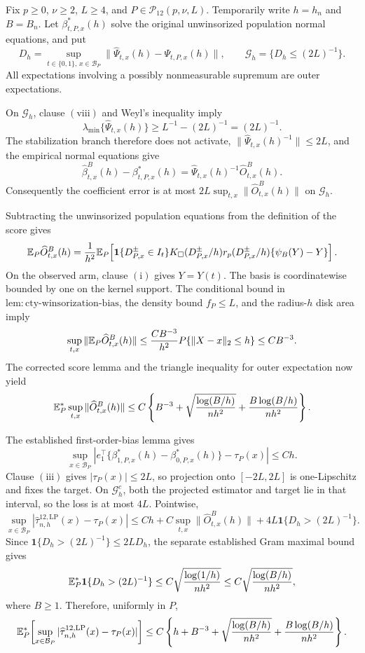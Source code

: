 Fix \(p\geq0\), \(\nu\geq2\), \(L\geq4\), and \(P\in\mathcal P_{12}(p,\nu,L)\).  Temporarily write \(h=h_n\) and \(B=B_n\).  Let \(\beta^*_{t,P,x}(h)\) solve the original unwinsorized population normal equations, and put
\[
 D_h=\sup_{t\in\{0,1\},\,x\in\mathcal B_P}
 \|\widehat\Psi_{t,x}(h)-\Psi_{t,P,x}(h)\|,
 \qquad \mathcal G_h=\{D_h\leq(2L)^{-1}\}.
\]
All expectations involving a possibly nonmeasurable supremum are outer expectations.

On \(\mathcal G_h\), clause \(\mathrm{(viii)}\) and Weyl's inequality imply
\[
 \lambda_{\min}\{\widehat\Psi_{t,x}(h)\}\geq L^{-1}-(2L)^{-1}=(2L)^{-1}.
\]
The stabilization branch therefore does not activate, \(\|\widehat\Psi_{t,x}(h)^{-1}\|\leq2L\), and the empirical normal equations give
\[
 \widehat\beta^B_{t,x}(h)-\beta^*_{t,P,x}(h)
 =\widehat\Psi_{t,x}(h)^{-1}\widehat O^B_{t,x}(h).
\]
Consequently the coefficient error is at most \(2L\sup_{t,x}\|\widehat O^B_{t,x}(h)\|\) on \(\mathcal G_h\).

Subtracting the unwinsorized population equations from the definition of the score gives
\[
 \mathbb E_P\widehat O^B_{t,x}(h)
 ={1\over h^2}\mathbb E_P\!\left[
 \mathbf1\{D^{\pm}_{P,x}\in I_t\}K_\square(D^{\pm}_{P,x}/h)
 r_p(D^{\pm}_{P,x}/h)\{\psi_B(Y)-Y\}
 \right].
\]
On the observed arm, clause \(\mathrm{(i)}\) gives \(Y=Y(t)\).  The basis is coordinatewise bounded by one on the kernel support.  The conditional bound in \(\mathrm{lem:cty\text{-}winsorization\text{-}bias}\), the density bound \(f_P\leq L\), and the radius-\(h\) disk area imply
\[
 \sup_{t,x}\|\mathbb E_P\widehat O^B_{t,x}(h)\|
 \leq {C B^{-3}\over h^2}P\{\|X-x\|_2\leq h\}
 \leq C B^{-3}.
\]
The corrected score lemma and the triangle inequality for outer expectation now yield
\[
 \mathbb E_P^*\sup_{t,x}\|\widehat O^B_{t,x}(h)\|
 \leq C\left\{B^{-3}+\sqrt{{\log(B/h)\over nh^2}}
 +{B\log(B/h)\over nh^2}\right\}.
\]

The established first-order-bias lemma gives
\[
 \sup_{x\in\mathcal B_P}\left|
 e_1^\top\{\beta^*_{1,P,x}(h)-\beta^*_{0,P,x}(h)\}-\tau_P(x)
 \right|\leq Ch.
\]
Clause \(\mathrm{(iii)}\) gives \(|\tau_P(x)|\leq2L\), so projection onto \([-2L,2L]\) is one-Lipschitz and fixes the target.  On \(\mathcal G_h^c\), both the projected estimator and target lie in that interval, so the loss is at most \(4L\).  Pointwise,
\[
 \sup_{x\in\mathcal B_P}|\widehat\tau^{12,\mathrm{LP}}_{n,h}(x)-\tau_P(x)|
 \leq Ch+C\sup_{t,x}\|\widehat O^B_{t,x}(h)\|
 +4L\mathbf1\{D_h>(2L)^{-1}\}.
\]
Since \(\mathbf1\{D_h>(2L)^{-1}\}\leq2LD_h\), the separate established Gram maximal bound gives
\[
 \mathbb E_P^*\mathbf1\{D_h>(2L)^{-1}\}
 \leq C\sqrt{{\log(1/h)\over nh^2}}
 \leq C\sqrt{{\log(B/h)\over nh^2}},
\]
where \(B\geq1\).  Therefore, uniformly in \(P\),
\[
 \mathbb E_P^*\!\left[\sup_{x\in\mathcal B_P}
 |\widehat\tau^{12,\mathrm{LP}}_{n,h}(x)-\tau_P(x)|\right]
 \leq C\left\{h+B^{-3}+\sqrt{{\log(B/h)\over nh^2}}
 +{B\log(B/h)\over nh^2}\right\}.
\]

